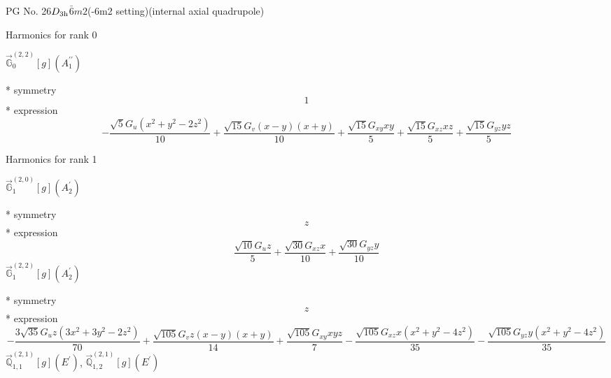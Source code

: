 \documentclass[fleqn,8pt]{jsarticle}
\begin{document}
\setcounter{MaxMatrixCols}{32}

\renewcommand{\tablename}{Table~}
\renewcommand{\figurename}{Figure~}
\begin{center}
\LARGE
PG No. 26\quad$D_{\rm 3h}$\quad$\bar{6}m2$\quad(-6m2 setting)\quad[ hexagonal ] (internal axial quadrupole)
\end{center}

\noindent * Harmonics for rank 0

\noindent\quad $\vec{\mathbb{G}}_{0}^{(2,2)}[g](A_{1}^{\prime\prime})$

\noindent\quad ** symmetry
\begin{dmath*}
1
\end{dmath*}
\noindent\quad ** expression
\begin{dmath*}
- \frac{\sqrt{5} G_{u} \left(x^{2} + y^{2} - 2 z^{2}\right)}{10} + \frac{\sqrt{15} G_{v} \left(x - y\right) \left(x + y\right)}{10} + \frac{\sqrt{15} G_{xy} x y}{5} + \frac{\sqrt{15} G_{xz} x z}{5} + \frac{\sqrt{15} G_{yz} y z}{5}
\end{dmath*}

\noindent * Harmonics for rank 1

\noindent\quad $\vec{\mathbb{G}}_{1}^{(2,0)}[g](A_{2}^{\prime})$

\noindent\quad ** symmetry
\begin{dmath*}
z
\end{dmath*}
\noindent\quad ** expression
\begin{dmath*}
\frac{\sqrt{10} G_{u} z}{5} + \frac{\sqrt{30} G_{xz} x}{10} + \frac{\sqrt{30} G_{yz} y}{10}
\end{dmath*}
\noindent\quad $\vec{\mathbb{G}}_{1}^{(2,2)}[g](A_{2}^{\prime})$

\noindent\quad ** symmetry
\begin{dmath*}
z
\end{dmath*}
\noindent\quad ** expression
\begin{dmath*}
- \frac{3 \sqrt{35} G_{u} z \left(3 x^{2} + 3 y^{2} - 2 z^{2}\right)}{70} + \frac{\sqrt{105} G_{v} z \left(x - y\right) \left(x + y\right)}{14} + \frac{\sqrt{105} G_{xy} x y z}{7} - \frac{\sqrt{105} G_{xz} x \left(x^{2} + y^{2} - 4 z^{2}\right)}{35} - \frac{\sqrt{105} G_{yz} y \left(x^{2} + y^{2} - 4 z^{2}\right)}{35}
\end{dmath*}
\noindent\quad $\vec{\mathbb{Q}}_{1,1}^{(2,1)}[g](E^{\prime})$, $\vec{\mathbb{Q}}_{1,2}^{(2,1)}[g](E^{\prime})$
\end{document}
